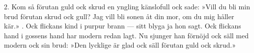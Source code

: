 \setlength{\columnsep}{0.5cm}
\begin{multicols}{2}
2.  Kom så förutan guld ock skrud
    en yngling känslofull
    ock sade: »Vill du bli min brud
    förutan skrud ock gull?
    Jag vill bli sonen åt din mor,
    om du mig håller kär.»
\vfill{}.  Ock flickans kind i purpur brann —
    sitt blyga ja hon sagt.
    Ock flickans hand i gossens hand
    har modern redan lagt.
    Nu sjunger han förnöjd ock säll
    med modern ock sin brud:
    »Den lycklige är glad ock säll
    förutan guld ock skrud.»
\end{multicols}
